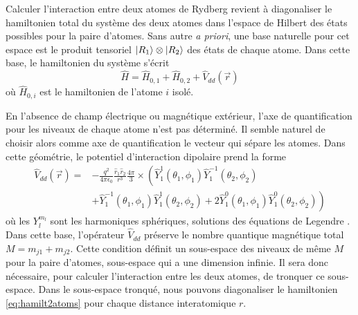 \bigskip
Calculer l'interaction entre deux atomes de Rydberg revient à diagonaliser le hamiltonien total du système des deux atomes dans l'espace de Hilbert des états possibles pour la paire d'atomes.
Sans autre \textit{a priori}, une base naturelle pour cet espace est le produit tensoriel $\ket{R_1}\otimes\ket{R_2}$ des états de chaque atome.
Dans cette base, le hamiltonien du système s'écrit
\begin{equation}\label{eq:hamilt2atoms}
\hat{H} = \hat{H}_{0,1} + \hat{H}_{0,2} + \hat{V}_{dd}(\vec{r})
\end{equation}
où $\hat{H}_{0,i}$ est le hamiltonien de l'atome $i$ isolé.

En l'absence de champ électrique ou magnétique extérieur, l'axe de quantification pour les niveaux de chaque atome n'est pas déterminé.
Il semble naturel de choisir alors comme axe de quantification le vecteur qui sépare les atomes.
Dans cette géométrie, le potentiel d'interaction dipolaire prend la forme
\begin{equation}\label{eq:Vdd_rr1r2}
\begin{aligned}
\hat{V}_{dd}(\vec{r})=&
-\frac{q^2}{4\pi\epsilon_0}\frac{\hat{r}_1\hat{r}_2}{r^3}\frac{4\pi}{3} \times
\left( \hat{Y}^1_1(\theta_1,\phi_1) \hat{Y}^{-1}_1(\theta_2,\phi_2) \right. \\
&\left. + \hat{Y}^{-1}_1(\theta_1,\phi_1) \hat{Y}^{1}_1(\theta_2,\phi_2)
+ 2\hat{Y}^{0}_1(\theta_1,\phi_1) \hat{Y}^{0}_1(\theta_2,\phi_2)
\right)
\end{aligned}
\end{equation}
où les $Y^{m_l}_l$ sont les harmoniques sphériques, solutions des équations de Legendre \cite{TXT_COHEN1FR}.
Dans cette base, l'opérateur $\hat{V}_{dd}$ préserve le nombre quantique magnétique total $M=m_{j1}+m_{j2}$.
Cette condition définit un sous-espace des niveaux de même $M$ pour la paire d'atomes, sous-espace qui a une dimension infinie.
Il sera donc nécessaire, pour calculer l'interaction entre les deux atomes, de tronquer ce sous-espace.
Dans le sous-espace tronqué, nous pouvons diagonaliser le hamiltonien \eqref{eq:hamilt2atoms} pour chaque distance interatomique $r$.

